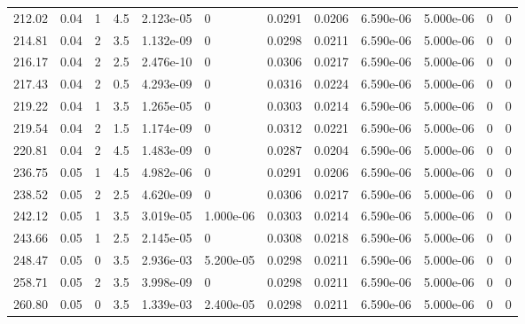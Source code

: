 \documentclass[preview]{standalone}
\begin{document}
{{{\begin{tabular}{L{1.2cm}C{1.2cm} C{0.3cm}C{0.5cm} C{1.4cm}C{1.4cm} C{1.4cm}C{1.4cm} C{1.6cm}C{1.6cm} C{1.6cm}C{1.6cm}}
  212.02  &  0.04  & 1     & 4.5 &  2.123e-05  & 0  &  0.0291&   0.0206& 6.590e-06 & 5.000e-06   &  0 & 0  \\ 
  214.81  &  0.04  & 2     & 3.5 &  1.132e-09  & 0  &  0.0298&   0.0211& 6.590e-06 & 5.000e-06   &  0 & 0  \\ 
  216.17  &  0.04  & 2     & 2.5 &  2.476e-10  & 0  &  0.0306&   0.0217& 6.590e-06 & 5.000e-06   &  0 & 0  \\ 
  217.43  &  0.04  & 2     & 0.5 &  4.293e-09  & 0  &  0.0316&   0.0224& 6.590e-06 & 5.000e-06   &  0 & 0  \\ 
  219.22  &  0.04  & 1     & 3.5 &  1.265e-05  & 0  &  0.0303&   0.0214& 6.590e-06 & 5.000e-06   &  0 & 0  \\ 
  219.54  &  0.04  & 2     & 1.5 &  1.174e-09  & 0  &  0.0312&   0.0221& 6.590e-06 & 5.000e-06   &  0 & 0  \\ 
  220.81  &  0.04  & 2     & 4.5 &  1.483e-09  & 0  &  0.0287&   0.0204& 6.590e-06 & 5.000e-06   &  0 & 0  \\ 
  236.75  &  0.05  & 1     & 4.5 &  4.982e-06  & 0  &  0.0291&   0.0206& 6.590e-06 & 5.000e-06   &  0 & 0  \\ 
  238.52  &  0.05  & 2     & 2.5 &  4.620e-09  & 0  &  0.0306&   0.0217& 6.590e-06 & 5.000e-06   &  0 & 0  \\ 
  242.12  &  0.05  & 1     & 3.5 &  3.019e-05  & 1.000e-06  &  0.0303&   0.0214& 6.590e-06 & 5.000e-06   &  0 & 0  \\ 
  243.66  &  0.05  & 1     & 2.5 &  2.145e-05  & 0  &  0.0308&   0.0218& 6.590e-06 & 5.000e-06   &  0 & 0  \\ 
  248.47  &  0.05  & 0     & 3.5 &  2.936e-03  & 5.200e-05  &  0.0298&   0.0211& 6.590e-06 & 5.000e-06   &  0 & 0  \\ 
  258.71  &  0.05  & 2     & 3.5 &  3.998e-09  & 0  &  0.0298&   0.0211& 6.590e-06 & 5.000e-06   &  0 & 0  \\ 
  260.80  &  0.05  & 0     & 3.5 &  1.339e-03  & 2.400e-05  &  0.0298&   0.0211& 6.590e-06 & 5.000e-06   &  0 & 0  \\ 
\hline 
\end{tabular} 

}}}
\end{document}
